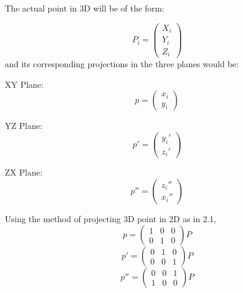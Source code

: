 \documentclass[a4paper,11pt,openany]{book}
\begin{document}
The actual point in 3D will be of the form:

\begin{equation}
P_{i} = 
\left(\begin{array}{c} X_i \\ Y_i \\ Z_i \end{array}\right)
\end{equation}
 and its corresponding projections in the three planes would be:

XY Plane:
\begin{equation}
p = 
\left(\begin{array}{c} x_i \\ y_i\end{array}\right)
\end{equation}

YZ Plane:
\begin{equation}
p' = 
\left(\begin{array}{c} y_i' \\ z_i'\end{array}\right)
\end{equation}

ZX Plane:
\begin{equation}
p'' = 
\left(\begin{array}{c} z_i'' \\ x_i''\end{array}\right)
\end{equation}


Using the method of projecting 3D point in 2D as in 2.1,
\begin{equation}
p = 
\left(\begin{array}{ccc} 1 & 0 & 0\\ 0 & 1 & 0\end{array}\right)P
\end{equation}
\begin{equation}
p' = 
\left(\begin{array}{ccc} 0 & 1 & 0\\ 0 & 0 & 1\end{array}\right)P
\end{equation}
\begin{equation}
p'' = 
\left(\begin{array}{ccc} 0 & 0 & 1\\ 1 & 0 & 0\end{array}\right)P
\end{equation}
\end{document}
